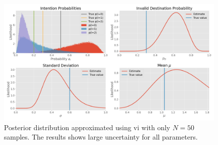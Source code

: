 \begin{figure}[h]
    \centering
    \includegraphics[width=\textwidth]{figures/example_vi_low_N.png}
    \caption{Posterior distribution approximated using \acrshort{vi} with only $N=50$ samples. The results shows large uncertainty for all parameters.}
    \label{fig:example_vi_low_N}
\end{figure}


